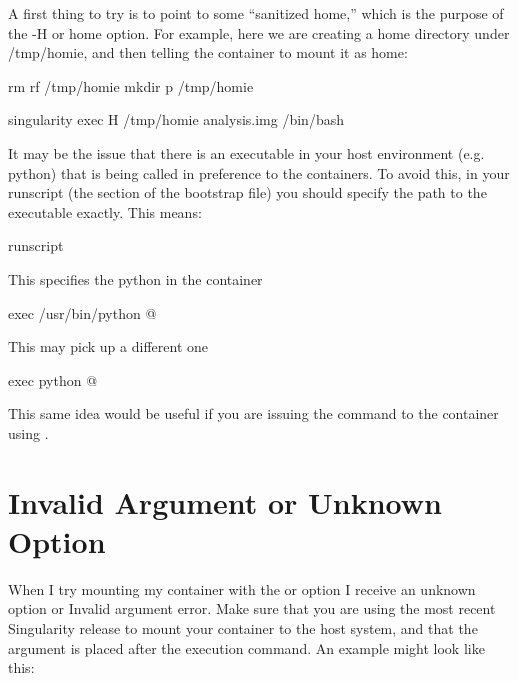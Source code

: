 \documentclass[letterpaper,10pt,english]{sphinxmanual}
\begin{document}
A first thing to try is to point to some “sanitized home,” which is
the purpose of the -H or \textendash{}home option. For example, here we are
creating a home directory under /tmp/homie, and then telling the
container to mount it as home:

%
\begin{sphinxVerbatim}[commandchars=\\\{\}]
rm \PYGZhy{}rf /tmp/homie \PYGZam{}\PYGZam{} mkdir \PYGZhy{}p /tmp/homie \PYGZam{}\PYGZam{} \PYGZbs{}

singularity exec \PYGZhy{}H /tmp/homie analysis.img /bin/bash
\end{sphinxVerbatim}

It may be the issue that there is an executable in your host
environment (e.g. python) that is being called in preference to the
containers. To avoid this, in your runscript (the  section of the
bootstrap file) you should specify the path to the executable exactly.
This means:

%
\begin{sphinxVerbatim}[commandchars=\\\{\}]
\PYGZpc{}runscript


\PYGZsh{} This specifies the python in the container

exec /usr/bin/python \PYGZdq{}\PYGZdl{}@\PYGZdq{}


\PYGZsh{} This may pick up a different one

exec python \PYGZdq{}\PYGZdl{}@\PYGZdq{}
\end{sphinxVerbatim}

This same idea would be useful if you are issuing the command to the
container using .


\section{Invalid Argument or Unknown Option}
\label{\detokenize{troubleshooting:invalid-argument-or-unknown-option}}
When I try mounting my container with the  or  option I receive an
unknown option or Invalid argument error.
Make sure that you are using the most recent Singularity release to
mount your container to the host system, and that the  argument is
placed after the execution command. An example might look like this:
\end{document}
